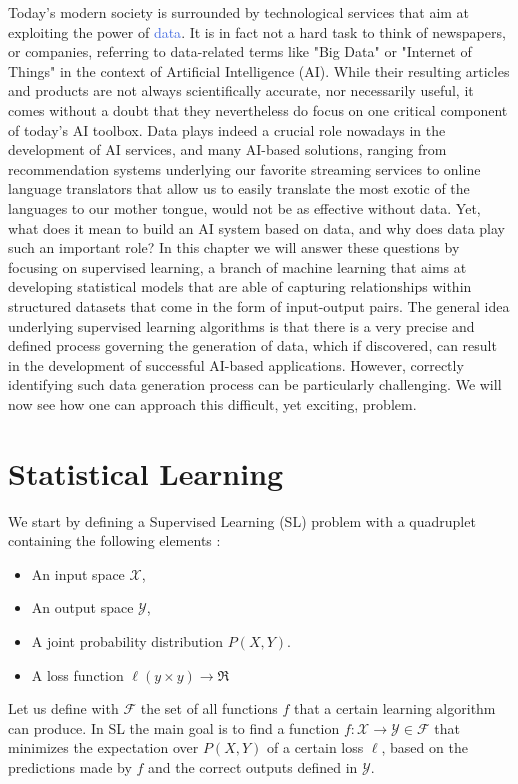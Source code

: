 Today's modern society is surrounded by technological services that aim at exploiting the power of \textcolor{RoyalBlue}{data}. It is in fact not a hard task to think of newspapers, or companies, referring to data-related terms like "Big Data" or "Internet of Things" in the context of Artificial Intelligence (AI). While their resulting articles and products are not always scientifically accurate, nor necessarily useful, it comes without a doubt that they nevertheless do focus on one critical component of today's AI toolbox. Data plays indeed a crucial role  nowadays in the development of AI services, and many AI-based solutions, ranging from recommendation systems underlying our favorite streaming services to online language translators that allow us to easily translate the most exotic of the languages to our mother tongue, would not be as effective without data. Yet, what does it mean to build an AI system based on data, and why does data play such an important role? In this chapter we will answer these questions by focusing on supervised learning, a branch of machine learning that aims at developing statistical models that are able of capturing relationships within structured datasets that come in the form of input-output pairs. The general idea underlying supervised learning algorithms is that there is a very precise and defined process governing the generation of data, which if discovered, can result in the development of successful AI-based applications. However, correctly identifying such data generation process can be particularly challenging. We will now see how one can approach this difficult, yet exciting, problem.    

\section{Statistical Learning}
\label{sec:learning_from_data}

We start by defining a Supervised Learning (SL) problem with a quadruplet containing the following elements \cite{friedman2001elements, louppe2014understanding}:
\begin{itemize}
	\item An input space $\mathcal{X}$,
	\item An output space $\mathcal{Y}$,
	\item A joint probability distribution $P(X,Y)$.
	\item A loss function $\ell(y \times y) \rightarrow \Re$
\end{itemize}
Let us define with $\mathcal{F}$ the set of all functions $f$ that a certain learning algorithm can produce. In SL the main goal is to find a function $f:\mathcal{X}\rightarrow\mathcal{Y} \in \mathcal{F}$ that minimizes the expectation over $P(X,Y)$ of a certain loss $\ell$, based on the predictions made by $f$ and the correct outputs defined in $\mathcal{Y}$.

